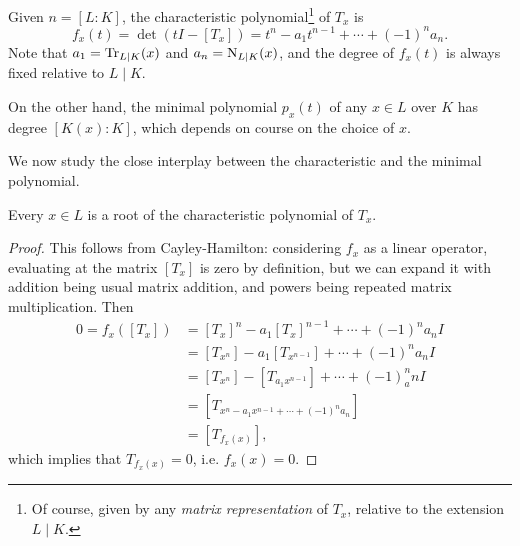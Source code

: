 Given $n=[L : K]$, the characteristic polynomial\footnote{Of course, given by any \emph{matrix representation} of $T_x$, relative to the extension $L\mid K$.} of $T_x$ is
\[
	f_x(t) = \det(tI - [T_x]) = t^n - a_1t^{n-1} + \cdots + (-1)^na_n.
\]
Note that $a_1=\operatorname{Tr}_{L\mid K}(x)$ and $a_n=\operatorname{N}_{L\mid K}(x)$, and the degree of $f_x(t)$ is always fixed relative to $L\mid K$.

On the other hand, the minimal polynomial $p_x(t)$ of any $x\in L$ over $K$ has degree $[K(x) : K]$, which depends on course on the choice of $x$.



We now study the close interplay between the characteristic and the minimal polynomial.

\begin{proposition}
	Every $x \in L$ is a root of the characteristic polynomial of $T_x$.
\end{proposition}
\begin{proof}
	This follows from Cayley-Hamilton: considering $f_x$ as a linear operator, evaluating at the matrix $[T_x]$ is zero by definition, but we can expand it with addition being usual matrix addition, and powers being repeated matrix multiplication. Then
	\begin{align*}
		0 = f_x([T_x]) &= [T_x]^n - a_1[T_x]^{n-1} + \cdots + (-1)^na_n I\\
			&= [T_{x^n}] - a_1[T_{x^{n-1}}] + \cdots + (-1)^na_n I\\
			&= [T_{x^n}] - [T_{a_1x^{n-1}}] + \cdots + (-1)^n_an I\\
			&= [T_{x^n-a_1x^{n-1} + \cdots + (-1)^na_n}]\\
			&= [T_{f_x(x)}],
	\end{align*}
	which implies that $T_{f_x(x)}=0$, i.e. $f_x(x)=0$.
\end{proof}

